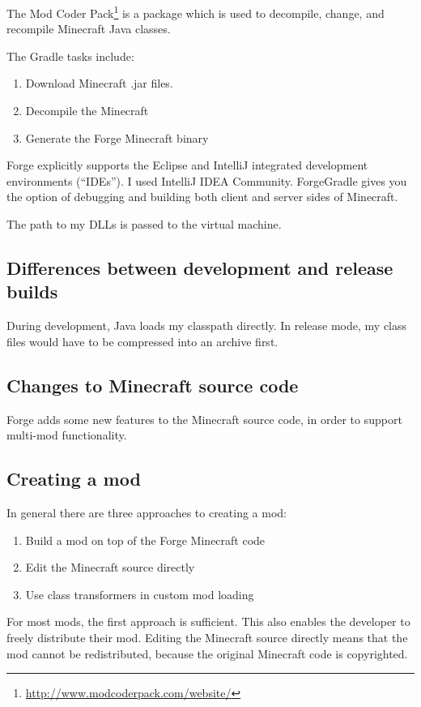 \documentclass[]{article}
\begin{document}
The Mod Coder Pack\footnote{\url{http://www.modcoderpack.com/website/}} is a package which is used to decompile, change, and recompile Minecraft Java classes.

The Gradle tasks include:
\begin{enumerate}
  \item Download Minecraft .jar files.
  \item Decompile the Minecraft 
  \item Generate the Forge Minecraft binary
\end{enumerate}

Forge explicitly supports the Eclipse and IntelliJ integrated development environments (\enquote{IDEs}).
I used IntelliJ IDEA Community.
ForgeGradle gives you the option of debugging and building both client and server sides of Minecraft.

The path to my DLLs is passed to the virtual machine.

\subsection{Differences between development and release builds}
During development, Java loads my classpath directly.
In release mode, my class files would have to be compressed into an archive first.

\subsection{Changes to Minecraft source code}
Forge adds some new features to the Minecraft source code, in order to support multi-mod functionality.

\subsection{Creating a mod}
In general there are three approaches to creating a mod:
\begin{enumerate}
  \item Build a mod on top of the Forge Minecraft code
  \item Edit the Minecraft source directly
  \item Use class transformers in custom mod loading
\end{enumerate}
For most mods, the first approach is sufficient.
This also enables the developer to freely distribute their mod.
Editing the Minecraft source directly means that the mod cannot be redistributed, because the original Minecraft code is copyrighted.
\end{document}
